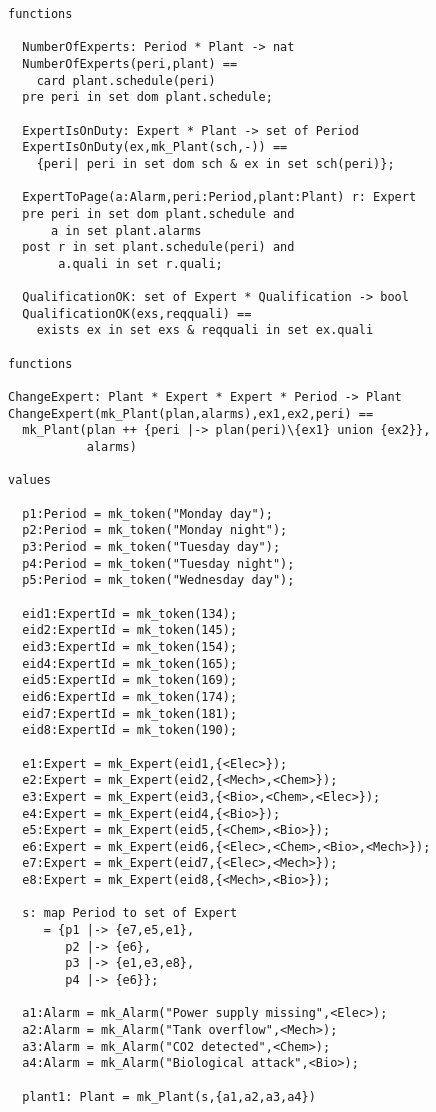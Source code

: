\begin{lstlisting}
functions

  NumberOfExperts: Period * Plant -> nat
  NumberOfExperts(peri,plant) ==
    card plant.schedule(peri)
  pre peri in set dom plant.schedule;

  ExpertIsOnDuty: Expert * Plant -> set of Period
  ExpertIsOnDuty(ex,mk_Plant(sch,-)) ==
    {peri| peri in set dom sch & ex in set sch(peri)};

  ExpertToPage(a:Alarm,peri:Period,plant:Plant) r: Expert
  pre peri in set dom plant.schedule and
      a in set plant.alarms
  post r in set plant.schedule(peri) and
       a.quali in set r.quali;

  QualificationOK: set of Expert * Qualification -> bool
  QualificationOK(exs,reqquali) ==
    exists ex in set exs & reqquali in set ex.quali

functions

ChangeExpert: Plant * Expert * Expert * Period -> Plant
ChangeExpert(mk_Plant(plan,alarms),ex1,ex2,peri) ==
  mk_Plant(plan ++ {peri |-> plan(peri)\{ex1} union {ex2}},
           alarms)

values
 
  p1:Period = mk_token("Monday day");
  p2:Period = mk_token("Monday night");
  p3:Period = mk_token("Tuesday day");
  p4:Period = mk_token("Tuesday night");
  p5:Period = mk_token("Wednesday day");

  eid1:ExpertId = mk_token(134);
  eid2:ExpertId = mk_token(145);
  eid3:ExpertId = mk_token(154);
  eid4:ExpertId = mk_token(165);
  eid5:ExpertId = mk_token(169);
  eid6:ExpertId = mk_token(174);
  eid7:ExpertId = mk_token(181);
  eid8:ExpertId = mk_token(190);
  
  e1:Expert = mk_Expert(eid1,{<Elec>});
  e2:Expert = mk_Expert(eid2,{<Mech>,<Chem>});
  e3:Expert = mk_Expert(eid3,{<Bio>,<Chem>,<Elec>});
  e4:Expert = mk_Expert(eid4,{<Bio>});
  e5:Expert = mk_Expert(eid5,{<Chem>,<Bio>});
  e6:Expert = mk_Expert(eid6,{<Elec>,<Chem>,<Bio>,<Mech>});
  e7:Expert = mk_Expert(eid7,{<Elec>,<Mech>});
  e8:Expert = mk_Expert(eid8,{<Mech>,<Bio>});

  s: map Period to set of Expert
     = {p1 |-> {e7,e5,e1},
        p2 |-> {e6},
        p3 |-> {e1,e3,e8},
        p4 |-> {e6}};

  a1:Alarm = mk_Alarm("Power supply missing",<Elec>);
  a2:Alarm = mk_Alarm("Tank overflow",<Mech>);
  a3:Alarm = mk_Alarm("CO2 detected",<Chem>);
  a4:Alarm = mk_Alarm("Biological attack",<Bio>);

  plant1: Plant = mk_Plant(s,{a1,a2,a3,a4})
\end{lstlisting}  

